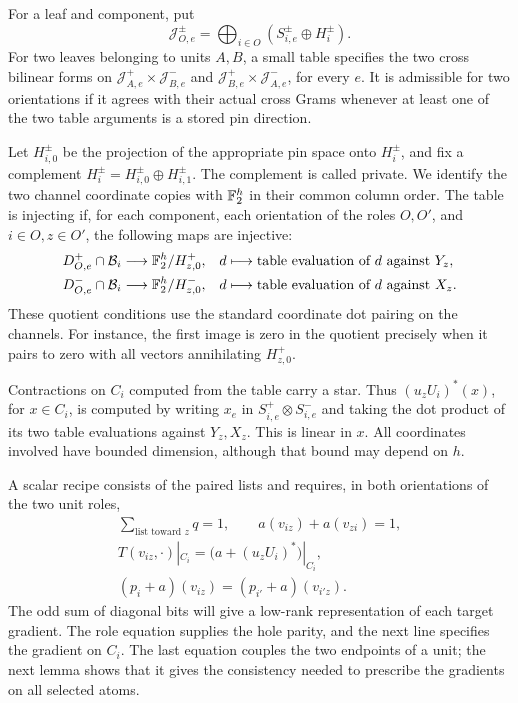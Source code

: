 \begin{definition}\label{def:small-table}
For a leaf and component, put
\[
 \mathcal J_{O,e}^{\pm}
 =\bigoplus_{i\in O}(S_{i,e}^{\pm}\oplus H_i^{\pm}).
\]
For two leaves belonging to units $A,B$, a small table specifies
the two cross bilinear forms on
$\mathcal J_{A,e}^+\times\mathcal J_{B,e}^-$ and
$\mathcal J_{B,e}^+\times\mathcal J_{A,e}^-$, for every $e$.
It is admissible for two orientations if it agrees with their
actual cross Grams whenever at least one of the two table
arguments is a stored pin direction.

Let $H_{i,0}^{\pm}$ be the projection of the appropriate pin
space onto $H_i^{\pm}$, and fix a complement
$H_i^{\pm}=H_{i,0}^{\pm}\oplus H_{i,1}^{\pm}$.
The complement is called private.  We identify the two channel
coordinate copies with $\mathbb F_2^h$ in their common column order.
The table is injecting if, for each component, each orientation
of the roles $O,O'$, and $i\in O,z\in O'$, the following maps
are injective:
\begin{align}\label{eq:table-injection}
 D_{O,e}^+\cap\mathcal B_i&\longrightarrow\mathbb F_2^h/H_{z,0}^+,
 &d&\longmapsto\text{table evaluation of $d$ against $Y_z$},\\
 D_{O,e}^-\cap\mathcal B_i&\longrightarrow\mathbb F_2^h/H_{z,0}^-,
 &d&\longmapsto\text{table evaluation of $d$ against $X_z$}.
 \notag
\end{align}
These quotient conditions use the standard coordinate dot
pairing on the channels.  For instance, the first image is
zero in the quotient precisely when it pairs to zero with
all vectors annihilating $H_{z,0}^+$.
\end{definition}

Contractions on $C_i$ computed from the table carry a star.
Thus $(u_zU_i)^*(x)$, for $x\in C_i$, is computed by writing
$x_e$ in $S_{i,e}^+\otimes S_{i,e}^-$ and taking the dot product
of its two table evaluations against $Y_z,X_z$.
This is linear in $x$.  All coordinates involved have bounded
dimension, although that bound may depend on $h$.

A scalar recipe consists of the paired lists and requires,
in both orientations of the two unit roles,
\begin{equation}\label{eq:recipe-scalars}
 \begin{gathered}
 \sum_{\text{list toward }z}q=1,
 \qquad a(v_{iz})+a(v_{zi})=1,\\
 T(v_{iz},\cdot)|_{C_i}
       =\bigl(a+(u_zU_i)^*\bigr)|_{C_i},\\
 (p_i+a)(v_{iz})=(p_{i'}+a)(v_{i'z}).
 \end{gathered}
\end{equation}
The odd sum of diagonal bits will give a low-rank representation
of each target gradient.  The role equation supplies the hole
parity, and the next line specifies the gradient on $C_i$.
The last equation couples the two endpoints of a unit; the next
lemma shows that it gives the consistency needed to prescribe
the gradients on all selected atoms.

